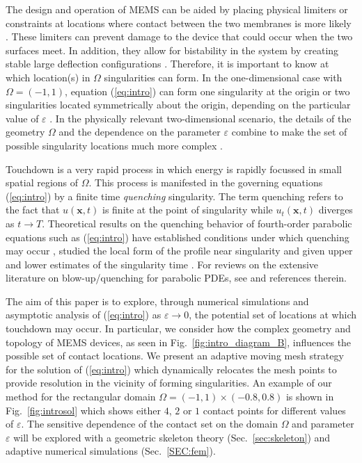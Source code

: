 \documentclass{siamart0516}
\renewcommand{\eqref}[1]{(\ref{#1})}
\newcommand{\eps}{\varepsilon}
\newcommand{\bx}{\mathbf{x}}
\theoremstyle{plain}%
\theoremstyle{definition}
\theoremstyle{remark}
\begin{document}
The design and operation of MEMS can be aided by placing physical limiters or constraints at locations where contact between the two membranes is more likely \cite{Krylov2010}. These limiters can prevent damage to the device that could occur when the two surfaces meet. In addition, they allow for bistability in the system by creating stable large deflection configurations \cite{Equilibrium2014,Lindsay2016,Qiu2004,Lulinsky2011,Craighead2008}. Therefore, it is important to know at which location(s) in $\Omega$ singularities can form. In the one-dimensional case with $\Omega=(-1,1)$, equation \eqref{eq:intro} can form one singularity at the origin or two singularities located symmetrically about the origin, depending on the particular value of $\eps$ \cite{Capacitor2012}. In the physically relevant two-dimensional scenario, the details of the geometry $\Omega$ and the dependence on the parameter $\eps$ combine to make the set of possible singularity locations much more complex \cite{Lindsay2013,selfsimilar2014}.

Touchdown is a very rapid process in which energy is rapidly focussed in small spatial regions of $\Omega$. This process is manifested in the governing equations \eqref{eq:intro} by a finite time \emph{quenching} singularity. The term quenching refers to the fact that $u(\bx,t)$ is finite at the point of singularity  while $u_t(\bx,t)$ diverges as $t\to T$. Theoretical results on the quenching behavior of fourth-order parabolic equations such as \eqref{eq:intro} have established conditions under which quenching may occur \cite{Capacitor2012,Lin2007}, studied the local form of the profile near singularity \cite{Lindsay2013,Capacitor2012,BGW,GALAK} and given upper and lower estimates of the singularity time \cite{Friedman88,Capacitor2012,Philippin15}. For reviews on the extensive literature on blow-up/quenching for parabolic PDEs, see \cite{Galaktionov2002} and references therein.

The aim of this paper is to explore, through numerical simulations and asymptotic analysis of \eqref{eq:intro} as $\eps\rightarrow 0$, the potential set of locations at which touchdown may occur. In particular, we consider how the complex geometry and topology of MEMS devices, as seen in Fig.~\ref{fig:intro_diagram_B}, influences the possible set of contact locations. We present an adaptive moving mesh strategy \cite{HR11} for the solution of \eqref{eq:intro} which dynamically relocates the mesh points to provide resolution in the vicinity of forming singularities. An example of our method for the rectangular domain $\Omega = (-1,1)\times(-0.8,0.8)$ is shown in Fig.~\ref{fig:introsol} which shows either $4$, $2$ or $1$ contact points for different values of $\eps$. The sensitive dependence of the contact set on the domain $\Omega$ and parameter $\eps$ will be explored with a geometric skeleton theory (Sec.~\ref{sec:skeleton}) and adaptive numerical simulations (Sec.~\ref{SEC:fem}). 
\end{document}
